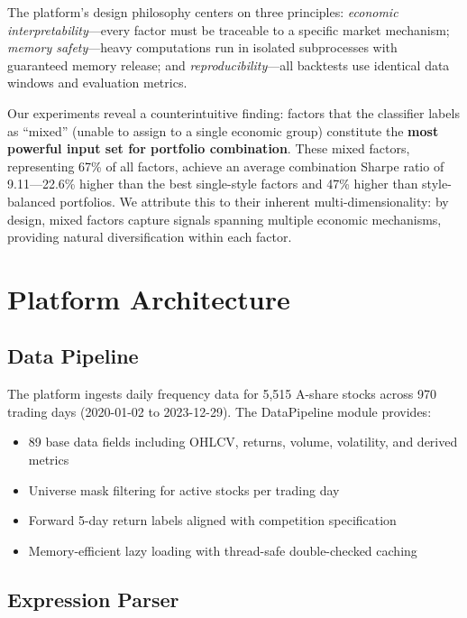 \documentclass[11pt,a4paper]{ctexart}
\begin{document}
The platform's design philosophy centers on three principles: \textit{economic interpretability}---every factor must be traceable to a specific market mechanism; \textit{memory safety}---heavy computations run in isolated subprocesses with guaranteed memory release; and \textit{reproducibility}---all backtests use identical data windows and evaluation metrics.

Our experiments reveal a counterintuitive finding: factors that the classifier labels as ``mixed'' (unable to assign to a single economic group) constitute the \textbf{most powerful input set for portfolio combination}. These mixed factors, representing 67\% of all factors, achieve an average combination Sharpe ratio of 9.11---22.6\% higher than the best single-style factors and 47\% higher than style-balanced portfolios. We attribute this to their inherent multi-dimensionality: by design, mixed factors capture signals spanning multiple economic mechanisms, providing natural diversification within each factor.

\section{Platform Architecture}

\subsection{Data Pipeline}

The platform ingests daily frequency data for 5,515 A-share stocks across 970 trading days (2020-01-02 to 2023-12-29). The DataPipeline module provides:

\begin{itemize}[nosep]
    \item 89 base data fields including OHLCV, returns, volume, volatility, and derived metrics
    \item Universe mask filtering for active stocks per trading day
    \item Forward 5-day return labels aligned with competition specification
    \item Memory-efficient lazy loading with thread-safe double-checked caching
\end{itemize}

\subsection{Expression Parser}
\end{document}
